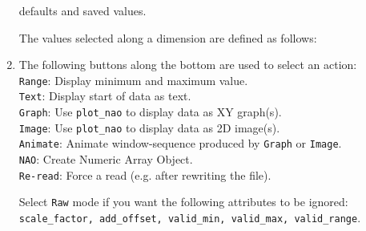 \begin{enumerate}
\begin{bullets}
      defaults and saved values.
\end{bullets}
    The values selected along a dimension are defined as follows:
    \item The following buttons along the bottom are used to select an
    action:
    \\
    \texttt{Range}: Display minimum and maximum value.
    \\
    \texttt{Text}: Display start of data as text.
    \\
    \texttt{Graph}: Use \texttt{plot\_nao} to display data as XY graph(s).
    \\
    \texttt{Image}: Use \texttt{plot\_nao} to display data as 2D image(s).
    \\
    \texttt{Animate}: Animate window-sequence produced by 
    \texttt{Graph} or 
    \texttt{Image}.
    \\
    \texttt{NAO}: Create Numeric Array Object.
    \\
    \texttt{Re-read}: Force a read (e.g. after rewriting the file).
    

Select 
    \texttt{Raw} mode if you want the following attributes to be
    ignored:
    \\
    \texttt{scale\_factor, add\_offset, valid\_min, valid\_max,
    valid\_range}.
  \end{enumerate}
